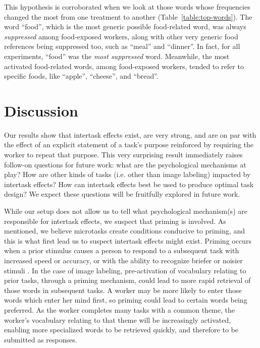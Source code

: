 \documentclass{sigchi}
\begin{document}
This hypothesis is corroborated when we look at those words whose 
frequencies changed the most from one treatment to another 
(Table~\ref{table:top-words}).  
The word ``food'', which is the most generic possible food-related word, 
was always \textit{suppressed} among food-exposed workers, along with other
very generic food references being suppressed too, such as ``meal'' and 
``dinner''.  In fact, 
for all experiments, ``food'' was the \textit{most suppressed} word.
Meanwhile, the most activated food-related words, among food-exposed 
workers, tended to refer to specific foods, 
like ``apple'', ``cheese'', and ``bread''.

\section{Discussion}
Our results show that intertask effects exist, are very strong, and are
on par with the effect of an explicit statement of a task's purpose 
reinforced by requiring the worker to repeat that purpose.  
This very surprising 
result immediately raises follow-on questions for future work: 
what are the psychological mechanisms at play? How are other kinds of 
tasks (i.e. other than image 
labeling) impacted by intertask effects?  How can intertask effects best 
be used to produce optimal task design?  We expect these questions will
be fruitfully explored in future work.

While our setup does not allow us to tell what psychological mechanism(s) 
are responsible for intertask effects, we suspect that priming is involved.
As mentioned, we believe microtasks create conditions conducive to priming,
and this is what first lead us to suspect intertask effects might exist.  
Priming occurs when a prior stimulus causes a person to respond to a 
subsequent task with increased speed or 
accuracy, or with the ability to recognize briefer or 
noisier stimuli \cite{BJOP1796,BJOP1826,Huber2008324}.
In the case of image labeling, pre-activation of 
vocabulary relating to prior tasks, through a priming mechanism, 
could lead to more rapid retrieval of those words in subsequent tasks.  
A worker may be more likely to enter those words which enter her mind 
first, so priming could lead to certain words being preferred.  
As the worker
completes many tasks with a common theme, the worker's vocabulary relating
to that theme will be increasingly activated, enabling more specialized
words to be retrieved quickly, and therefore to be submitted as responses.
\end{document}
